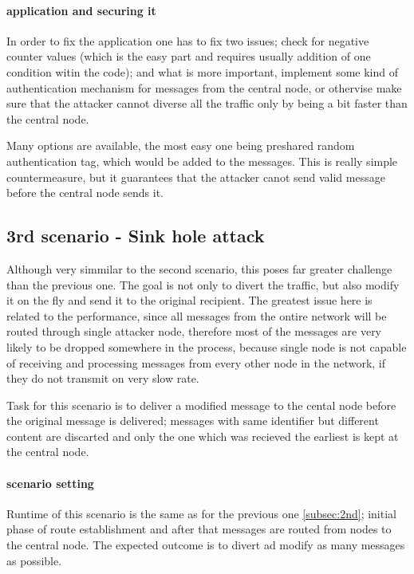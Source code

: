 \documentclass[
  digital, %
  table,   %
  nolof,     %
  nolot,     %
           oneside
]{fithesis3}
\begin{document}
    \paragraph{application and securing it}
    In order to fix the application one has to fix two issues; check for negative counter values (which is the easy part and requires usually addition of one condition witin the code); and what is more important, implement some kind of authentication mechanism for messages from the central node, or othervise make sure that the attacker cannot diverse all the traffic only by being a bit faster than the central node.

    Many options are available, the most easy one being preshared random authentication tag, which would be added to the messages. This is really simple countermeasure, but it guarantees that the attacker canot send valid message before the central node sends it.

    \subsection{3rd scenario - Sink hole attack}
    Although very simmilar to the second scenario, this poses far greater   challenge than the previous one. The goal is not only to divert the traffic, but also modify it on the fly and send it to the original recipient. The greatest issue here is related to the performance, since all messages from the ontire network will be routed through single attacker node, therefore most of the messages are very likely to be dropped somewhere in the process, because single node is not capable of receiving and processing messages from every other node in the network, if they do not transmit on very slow rate.

    Task for this scenario is to deliver a modified message to the cental node before the original message is delivered; messages with same identifier but different content are discarted and only the one which was recieved the earliest is kept at the central node.

    \paragraph{scenario setting}
    Runtime of this scenario is the same as for the previous one \ref{subsec:2nd}; initial phase of route establishment and after that messages are routed from nodes to the central node. The expected outcome is to divert ad modify as many messages as possible.
\end{document}
